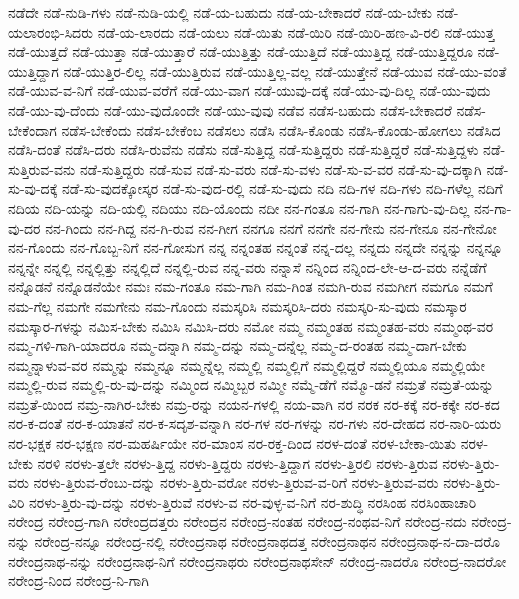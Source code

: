 {ನಡೆದೇ
ನಡೆ-ನುಡಿ-ಗಳು
ನಡೆ-ನುಡಿ-ಯಲ್ಲಿ
ನಡೆ-ಯ-ಬಹುದು
ನಡೆ-ಯ-ಬೇಕಾದರೆ
ನಡೆ-ಯ-ಬೇಕು
ನಡೆ-ಯಲಾರಂಭಿ-ಸಿದರು
ನಡೆ-ಯ-ಲಾರದು
ನಡೆ-ಯಲು
ನಡೆ-ಯಿತು
ನಡೆ-ಯಿರಿ
ನಡೆ-ಯಿರಿ-ಹಣ-ವಿ-ರಲಿ
ನಡೆ-ಯುತ್ತ
ನಡೆ-ಯುತ್ತದೆ
ನಡೆ-ಯುತ್ತಾ
ನಡೆ-ಯುತ್ತಾರೆ
ನಡೆ-ಯುತ್ತಿತ್ತು
ನಡೆ-ಯುತ್ತಿದೆ
ನಡೆ-ಯುತ್ತಿದ್ದ
ನಡೆ-ಯುತ್ತಿದ್ದರೂ
ನಡೆ-ಯುತ್ತಿದ್ದಾಗ
ನಡೆ-ಯುತ್ತಿರ-ಲಿಲ್ಲ
ನಡೆ-ಯುತ್ತಿರುವ
ನಡೆ-ಯುತ್ತಿಲ್ಲ-ವಲ್ಲ
ನಡೆ-ಯುತ್ತೇನೆ
ನಡೆ-ಯುವ
ನಡೆ-ಯು-ವಂತೆ
ನಡೆ-ಯುವ-ವ-ನಿಗೆ
ನಡೆ-ಯುವ-ವರೆಗೆ
ನಡೆ-ಯು-ವಾಗ
ನಡೆ-ಯುವು-ದಕ್ಕೆ
ನಡೆ-ಯು-ವು-ದಿಲ್ಲ
ನಡೆ-ಯು-ವುದು
ನಡೆ-ಯು-ವು-ದೆಂದು
ನಡೆ-ಯು-ವುದೊಂದೇ
ನಡೆ-ಯು-ವುವು
ನಡೆವ
ನಡೆಸ-ಬಹುದು
ನಡೆಸ-ಬೇಕಾದರೆ
ನಡೆಸ-ಬೇಕೆಂದಾಗ
ನಡೆಸ-ಬೇಕೆಂದು
ನಡೆಸ-ಬೇಕೆಂಬ
ನಡೆಸಲು
ನಡೆಸಿ
ನಡೆಸಿ-ಕೊಂಡು
ನಡೆಸಿ-ಕೊಂಡು-ಹೋಗಲು
ನಡೆಸಿದ
ನಡೆಸಿ-ದಂತೆ
ನಡೆಸಿ-ದರು
ನಡೆಸಿ-ರುವೆನು
ನಡೆಸು
ನಡೆ-ಸುತ್ತಿದ್ದ
ನಡೆ-ಸುತ್ತಿದ್ದರು
ನಡೆ-ಸುತ್ತಿದ್ದರೆ
ನಡೆ-ಸುತ್ತಿದ್ದಳು
ನಡೆ-ಸುತ್ತಿರುವ-ವನು
ನಡೆ-ಸುತ್ತಿದ್ದರು
ನಡೆ-ಸುವ
ನಡೆ-ಸು-ವರು
ನಡೆ-ಸು-ವಳು
ನಡೆ-ಸು-ವ-ವರ
ನಡೆ-ಸು-ವು-ದಕ್ಕಾಗಿ
ನಡೆ-ಸು-ವು-ದಕ್ಕೆ
ನಡೆ-ಸು-ವುದಕ್ಕೋಸ್ಕರ
ನಡೆ-ಸು-ವುದ-ರಲ್ಲಿ
ನಡೆ-ಸು-ವುದು
ನದಿ
ನದಿ-ಗಳ
ನದಿ-ಗಳು
ನದಿ-ಗಳೆಲ್ಲ
ನದಿಗೆ
ನದಿಯ
ನದಿ-ಯನ್ನು
ನದಿ-ಯಲ್ಲಿ
ನದಿಯು
ನದಿ-ಯೊಂದು
ನದೀ
ನನ-ಗಂತೂ
ನನ-ಗಾಗಿ
ನನ-ಗಾಗು-ವು-ದಿಲ್ಲ
ನನ-ಗಾ-ವು-ದರ
ನನ-ಗಿಂದು
ನನ-ಗಿದ್ದ
ನನ-ಗಿ-ರುವ
ನನ-ಗೀಗ
ನನಗೂ
ನನಗೆ
ನನಗೇ
ನನ-ಗೇನು
ನನ-ಗೇನೂ
ನನ-ಗೇನೋ
ನನ-ಗೊಂದು
ನನ-ಗೊಬ್ಬ-ನಿಗೆ
ನನ-ಗೋಸುಗ
ನನ್ನ
ನನ್ನಂತಹ
ನನ್ನಂತೆ
ನನ್ನ-ದಲ್ಲ
ನನ್ನದು
ನನ್ನದೇ
ನನ್ನನ್ನು
ನನ್ನನ್ನೂ
ನನ್ನನ್ನೇ
ನನ್ನಲ್ಲಿ
ನನ್ನಲ್ಲಿತ್ತು
ನನ್ನಲ್ಲಿದೆ
ನನ್ನಲ್ಲಿ-ರುವ
ನನ್ನ-ವರು
ನನ್ನಾಸೆ
ನನ್ನಿಂದ
ನನ್ನಿಂದ-ಲೇ-ಆ-ದ-ವರು
ನನ್ನೆಡೆಗೆ
ನನ್ನೊಡನೆ
ನನ್ನೊಡನೆಯೇ
ನಮಃ
ನಮ-ಗಂತೂ
ನಮ-ಗಾಗಿ
ನಮ-ಗಿಂತ
ನಮಗಿ-ರುವ
ನಮಗೀಗ
ನಮಗೂ
ನಮಗೆ
ನಮ-ಗೆಲ್ಲ
ನಮಗೇ
ನಮಗೇನು
ನಮ-ಗೊಂದು
ನಮಸ್ಕರಿಸಿ
ನಮಸ್ಕರಿಸಿ-ದರು
ನಮಸ್ಕರಿ-ಸು-ವುದು
ನಮಸ್ಕಾರ
ನಮಸ್ಕಾರ-ಗಳನ್ನು
ನಮಿಸ-ಬೇಕು
ನಮಿಸಿ
ನಮಿಸಿ-ದರು
ನಮೋ
ನಮ್ಮ
ನಮ್ಮಂತಹ
ನಮ್ಮಂತಹ-ವರು
ನಮ್ಮಂಥ-ವರ
ನಮ್ಮ-ಗಳಿ-ಗಾಗಿ-ಯಾದರೂ
ನಮ್ಮ-ದನ್ನಾಗಿ
ನಮ್ಮ-ದನ್ನು
ನಮ್ಮ-ದನ್ನೆಲ್ಲ
ನಮ್ಮ-ದ-ರಂತಹ
ನಮ್ಮ-ದಾಗ-ಬೇಕು
ನಮ್ಮನ್ನಾಳುವ-ವರ
ನಮ್ಮನ್ನು
ನಮ್ಮನ್ನೂ
ನಮ್ಮನ್ನೆಲ್ಲ
ನಮ್ಮಲ್ಲಿ
ನಮ್ಮಲ್ಲಿಗೆ
ನಮ್ಮಲ್ಲಿದ್ದರೆ
ನಮ್ಮಲ್ಲಿಯೂ
ನಮ್ಮಲ್ಲಿಯೇ
ನಮ್ಮಲ್ಲಿ-ರುವ
ನಮ್ಮಲ್ಲಿ-ರು-ವು-ದನ್ನು
ನಮ್ಮಿಂದ
ನಮ್ಮಿಬ್ಬರ
ನಮ್ಮೀ
ನಮ್ಮೆ-ಡೆಗೆ
ನಮ್ಮೊ-ಡನೆ
ನಮ್ರತೆ
ನಮ್ರತೆ-ಯನ್ನು
ನಮ್ರತೆ-ಯಿಂದ
ನಮ್ರ-ನಾಗಿರ-ಬೇಕು
ನಮ್ರ-ರನ್ನು
ನಯನ-ಗಳಲ್ಲಿ
ನಯ-ವಾಗಿ
ನರ
ನರಕ
ನರ-ಕಕ್ಕೆ
ನರ-ಕಕ್ಕೇ
ನರ-ಕದ
ನರ-ಕ-ದಂತೆ
ನರ-ಕ-ಯಾತನೆ
ನರ-ಕ-ಸದೃಶ-ವನ್ನಾಗಿ
ನರ-ಗಳ
ನರ-ಗಳನ್ನು
ನರ-ಗಳು
ನರ-ದೇಹದ
ನರ-ನಾರಿ-ಯರು
ನರ-ಭಕ್ಷಕ
ನರ-ಭಕ್ಷಣ
ನರ-ಮಹರ್ಷಿಯೇ
ನರ-ಮಾಂಸ
ನರ-ರಕ್ತ-ದಿಂದ
ನರಳ-ದಂತೆ
ನರಳ-ಬೇಕಾ-ಯಿತು
ನರಳ-ಬೇಕು
ನರಳಿ
ನರಳು-ತ್ತಲೇ
ನರಳು-ತ್ತಿದ್ದ
ನರಳು-ತ್ತಿದ್ದರು
ನರಳು-ತ್ತಿದ್ದಾಗ
ನರಳು-ತ್ತಿರಲಿ
ನರಳು-ತ್ತಿರುವ
ನರಳು-ತ್ತಿರು-ವರು
ನರಳು-ತ್ತಿರುವ-ರೆಂಬು-ದನ್ನು
ನರಳು-ತ್ತಿರು-ವರೋ
ನರಳು-ತ್ತಿರುವ-ವ-ರಿಗೆ
ನರಳು-ತ್ತಿರುವ-ವರು
ನರಳು-ತ್ತಿರು-ವಿರಿ
ನರಳು-ತ್ತಿರು-ವು-ದನ್ನು
ನರಳು-ತ್ತಿರುವೆ
ನರಳು-ವ
ನರ-ವುಳ್ಳ-ವ-ನಿಗೆ
ನರ-ಶುದ್ಧಿ
ನರಸಿಂಹ
ನರಸಿಂಹಾಚಾರಿ
ನರೇಂದ್ರ
ನರೇಂದ್ರ-ಗಾಗಿ
ನರೇಂದ್ರದತ್ತರು
ನರೇಂದ್ರನ
ನರೇಂದ್ರ-ನಂತಹ
ನರೇಂದ್ರ-ನಂಥವ-ನಿಗೆ
ನರೇಂದ್ರ-ನದು
ನರೇಂದ್ರ-ನನ್ನು
ನರೇಂದ್ರ-ನನ್ನೂ
ನರೇಂದ್ರ-ನಲ್ಲಿ
ನರೇಂದ್ರನಾಥ
ನರೇಂದ್ರನಾಥದತ್ತ
ನರೇಂದ್ರನಾಥನ
ನರೇಂದ್ರನಾಥ-ನ-ದಾ-ದರೊ
ನರೇಂದ್ರನಾಥ-ನನ್ನು
ನರೇಂದ್ರನಾಥ-ನಿಗೆ
ನರೇಂದ್ರನಾಥರು
ನರೇಂದ್ರನಾಥಸೇನ್
ನರೇಂದ್ರ-ನಾದರೊ
ನರೇಂದ್ರ-ನಾದರೋ
ನರೇಂದ್ರ-ನಿಂದ
ನರೇಂದ್ರ-ನಿ-ಗಾಗಿ
}

